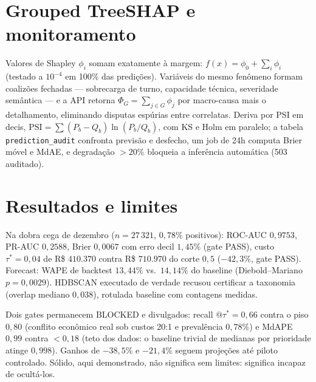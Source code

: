\documentclass[11pt,a4paper]{article}
\begin{document}
\section{Grouped TreeSHAP e monitoramento}

Valores de Shapley $\phi_i$ somam exatamente à margem:
$f(x)=\phi_0+\sum_i\phi_i$ (testado a $10^{-4}$ em 100\% das predições).
Variáveis do mesmo fenômeno formam coalizões fechadas ---
sobrecarga de turno, capacidade técnica, severidade semântica --- e a API
retorna $\Phi_G=\sum_{j\in G}\phi_j$ por macro-causa mais o detalhamento,
eliminando disputas espúrias entre correlatas. Deriva por PSI em decis,
$\mathrm{PSI}=\sum(P_b-Q_b)\ln(P_b/Q_b)$, com KS e Holm em paralelo; a tabela
\texttt{prediction\_audit} confronta previsão e desfecho, um job de 24h
computa Brier móvel e MdAE, e degradação $>20\%$ bloqueia a inferência
automática (503 auditado).

\section{Resultados e limites}

Na dobra cega de dezembro ($n=27\,321$, $0{,}78\%$ positivos): ROC-AUC
$0{,}9753$, PR-AUC $0{,}2588$, Brier $0{,}0067$ com erro decil $1{,}45\%$
(gate PASS), custo $\tau^*=0{,}04$ de R\$ $410{.}370$ contra R\$
$710{.}970$ do corte $0{,}5$ ($-42{,}3\%$, gate PASS). Forecast: WAPE de
backtest $13{,}44\%$ vs.\ $14{,}14\%$ do baseline (Diebold--Mariano
$p=0{,}0029$). HDBSCAN executado de verdade recusou certificar a taxonomia
(overlap mediano $0{,}038$), rotulada baseline com contagens medidas.

Dois gates permanecem BLOCKED e divulgados: recall $@\tau^*=0{,}66$ contra o
piso $0{,}80$ (conflito econômico real sob custos 20:1 e prevalência
$0{,}78\%$) e MdAPE $0{,}99$ contra $<0{,}18$ (teto dos dados: o baseline
trivial de medianas por prioridade atinge $0{,}998$). Ganhos de $-38{,}5\%$ e
$-21{,}4\%$ seguem projeções até piloto controlado. Sólido, aqui demonstrado,
não significa sem limites: significa incapaz de ocultá-los.
\end{document}
